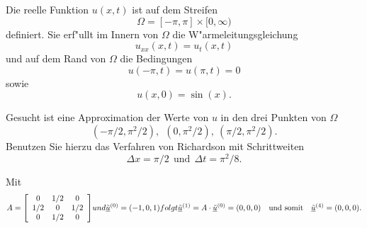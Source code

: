Die reelle Funktion $u(x,t)$ ist auf dem Streifen $$\Omega = [-\pi, \pi] \times [0,\infty)$$ definiert. Sie erf"ullt im Innern von $\Omega$ die W"armeleitungsgleichung $$u_{xx}(x,t) = u_{t}(x,t)$$ und auf dem Rand von $\Omega$ die Bedingungen $$u(- \pi,t) = u(\pi ,t) = 0$$ sowie $$u(x,0) = \sin(x).$$ 

\vspace{1mm}

Gesucht ist eine Approximation der Werte von $u$ in den drei Punkten von $\Omega$ $$(-\pi/2,\pi^2/2), \ \  (0,\pi^2/2), \ (\pi/2,\pi^2/2).$$ Benutzen Sie hierzu das Verfahren von Richardson mit Schrittweiten $$\Delta x = \pi/2 \ \ \mbox{und} \ \  \Delta t = \pi^2/8.$$

\begin{loesung}
Mit
\[
A = \left[\begin{array}{ccc} 
0 & 1/2 & 0 \\
1/2 & 0 & 1/2 \\ 0 & 1/2 & 0 \end{array}\right]$$ und $$\underline{\tilde u}^{(0)} = (-1, 0, 1)$$ folgt $$\underline{\tilde u}^{(1)} =  A \cdot \underline{\tilde u}^{(0)} = (0, 0, 0) \ \ \ \mbox{und somit} \ \ \ \underline{\tilde u}^{(4)} = (0, 0, 0).
\]
\end{loesung}

